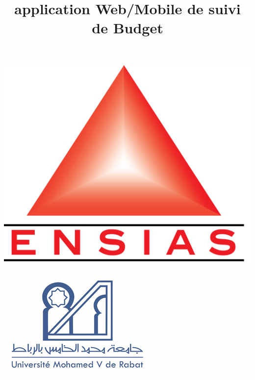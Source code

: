\documentclass[12pt,twoside]{report}
\title{application Web/Mobile de suivi de Budget }
\begin{document}
\begin{titlepage}
    \begin{minipage}[t]{0.2\textwidth}    %
      \centering\includegraphics[width=\linewidth]{ensias.png}
    \end{minipage}%
  \begin{minipage}[t][2cm]{0.5\textwidth}
    \centering\bfseries\large
    \hfill
  \end{minipage}%
    \begin{minipage}[t]{0.2\textwidth}
      \centering\includegraphics[width=\linewidth]{um5.png}
  \end{minipage}
  \begin{center}

\end{center}
\end{titlepage}
\end{document}
